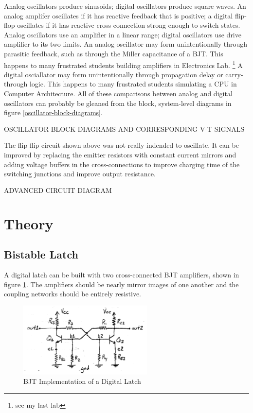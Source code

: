 \documentclass[titlepage, letterpaper, 10.5pt]{article}
\begin{document}
Analog oscillators produce sinusoids; digital oscillators produce square waves.
An analog amplifer oscillates if it has reactive feedback that is positive;
a digital flip-flop oscillates if it has reactive cross-connection strong enough to switch states.
Analog oscillators use an amplifier in a linear range; digital oscillators use drive
amplifier to its two limits.
An analog oscillator may form unintentionally through parasitic feedback,
such as through the Miller capacitance of a BJT.
This happens to many frustrated students building amplifiers in Electronics Lab.
\footnote{see my last lab}
A digital osciallator may form unintentionally through propagation delay or carry-through
logic. This happens to many frustrated students simulating a CPU in Computer Architecture.
All of these comparisons between analog and digital oscillators can probably be gleaned
from the block, system-level diagrams in figure \ref{oscillator-block-diagrams}.

OSCILLATOR BLOCK DIAGRAMS AND CORRESPONDING V-T SIGNALS

The flip-flip circuit shown above was not really indended to oscillate.
It can be improved by replacing the emitter resistors with constant current mirrors
and adding voltage buffers in the cross-connections to improve charging time of the
switching junctions and improve output resistance.

ADVANCED CIRCUIT DIAGRAM

\clearpage
\section{Theory}

\subsection{Bistable Latch}
\label{bistable-latch}

A digital latch can be built with two cross-connected BJT amplifiers, shown in figure
\ref{latch-circuit-diagram}. The amplifiers should be nearly mirror images of one another and the
coupling networks should be entirely resistive.

\begin{figure}[ht]
	\centering
	\includegraphics[width=0.6\textwidth]{diagrams/latch-circuit}
	\caption{BJT Implementation of a Digital Latch}
	\label{latch-circuit-diagram}
\end{figure}
\end{document}
